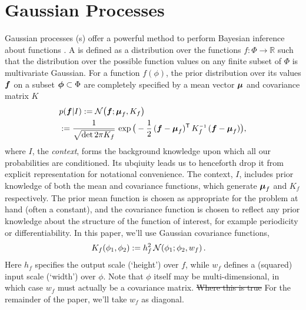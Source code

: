 \documentclass{article}
\begin{document}
\section{Gaussian Processes}
Gaussian processes (\gp s) offer a powerful method to perform Bayesian
inference about functions \citep{GPsBook}. A \gpb is defined as a
distribution over the functions $f: \Phi \rightarrow \mathbb{R}$ such
that the distribution over the possible function values on any finite
subset of $\Phi$ is multivariate Gaussian.  For a function $f(\phi)$,
the prior distribution over its values $\vf$ on a subset
$\vph \subset \Phi$ are completely specified by a mean vector
$\vmu$ and covariance matrix $K$
\begin{align*}%
\textstyle
 &\p{\vf}{I} \deq \N{\vf}{\vmu_{f}}{K_{f}}\\
 &\deq\frac{1}{\sqrt{\det{2\pi K_{f}}}}\,\exp \big(-\frac{1}{2}\,(\vf-\vmu_{f})\tra\,K_{f}\inv\,(\vf-\vmu_{f})\big),
\end{align*}
where $I$, the \emph{context}, forms the background knowledge upon which all our probabilities are conditioned. Its ubqiuity leads us to henceforth drop it from explicit representation for notational convenience. The context, $I$, includes prior knowledge of both the
mean and covariance functions, which generate $\vmu_{f}$ and
$K_{f}$ respectively. The prior mean function is chosen as
appropriate for the problem at hand (often a constant), and the
covariance function is chosen to reflect any prior knowledge about the
structure of the function of interest, for example periodicity or
differentiability. In this paper, we'll use Gaussian
covariance functions,
\begin{align} \label{eq:Gaussian_cov_fn}
\textstyle
K_{f}(\phi_1,\phi_2)& \deq h_f^2\,\N{\phi_1}{\phi_2}{w_{f}}.
\end{align} 
Here $h_f$ specifies the output scale (`height') over $f$, while $w_f$ defines a (squared) input scale (`width') over $\phi$. Note that $\phi$ itself may be multi-dimensional, in which case $w_f$ must actually be a covariance matrix. \sout{Where this is true} For the remainder of the paper, we'll take $w_f$ as diagonal. 
\end{document}
